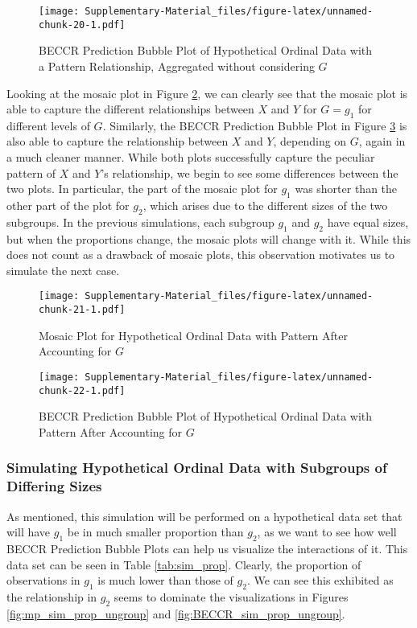 \documentclass[
]{article}
\begin{document}
\begin{figure}
\centering
\texttt{[image: Supplementary-Material\_files/figure-latex/unnamed-chunk-20-1.pdf]}
\caption{\label{fig:BECCR_sim_pattern_ungroup}BECCR Prediction Bubble
Plot of Hypothetical Ordinal Data with a Pattern Relationship,
Aggregated without considering \(G\)}
\end{figure}

Looking at the mosaic plot in Figure \ref{fig:mp_sim_pattern}, we can
clearly see that the mosaic plot is able to capture the different
relationships between \(X\) and \(Y\) for \(G=g_1\) for different levels
of \(G\). Similarly, the BECCR Prediction Bubble Plot in Figure
\ref{fig:BECCR_sim_pattern} is also able to capture the relationship
between \(X\) and \(Y\), depending on \(G\), again in a much cleaner
manner. While both plots successfully capture the peculiar pattern of
\(X\) and \(Y\)'s relationship, we begin to see some differences between
the two plots. In particular, the part of the mosaic plot for \(g_1\)
was shorter than the other part of the plot for \(g_2\), which arises
due to the different sizes of the two subgroups. In the previous
simulations, each subgroup \(g_1\) and \(g_2\) have equal sizes, but
when the proportions change, the mosaic plots will change with it. While
this does not count as a drawback of mosaic plots, this observation
motivates us to simulate the next case.

\begin{figure}
\centering
\texttt{[image: Supplementary-Material\_files/figure-latex/unnamed-chunk-21-1.pdf]}
\caption{\label{fig:mp_sim_pattern}Mosaic Plot for Hypothetical Ordinal
Data with Pattern After Accounting for \(G\)}
\end{figure}

\begin{figure}
\centering
\texttt{[image: Supplementary-Material\_files/figure-latex/unnamed-chunk-22-1.pdf]}
\caption{\label{fig:BECCR_sim_pattern}BECCR Prediction Bubble Plot of
Hypothetical Ordinal Data with Pattern After Accounting for \(G\)}
\end{figure}

\subsubsection{Simulating Hypothetical Ordinal Data with Subgroups of
Differing
Sizes}\label{simulating-hypothetical-ordinal-data-with-subgroups-of-differing-sizes}

As mentioned, this simulation will be performed on a hypothetical data
set that will have \(g_1\) be in much smaller proportion than \(g_2\),
as we want to see how well BECCR Prediction Bubble Plots can help us
visualize the interactions of it. This data set can be seen in Table
\ref{tab:sim_prop}. Clearly, the proportion of observations in \(g_1\)
is much lower than those of \(g_2\). We can see this exhibited as the
relationship in \(g_2\) seems to dominate the visualizations in Figures
\ref{fig:mp_sim_prop_ungroup} and \ref{fig:BECCR_sim_prop_ungroup}.
\end{document}
